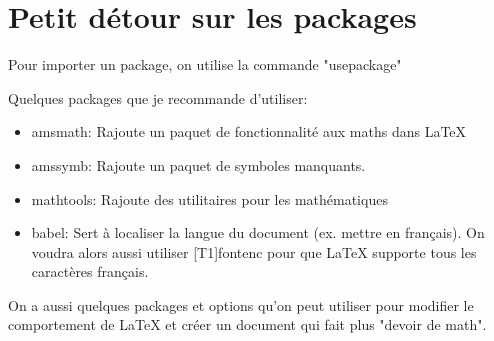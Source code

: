 \documentclass[letterpaper, french, 12pt]{article} %
\numberwithin{equation}{section}
\numberwithin{figure}{section}
\begin{document}
\section{Petit détour sur les packages}
Pour importer un package, on utilise la commande "usepackage"

Quelques packages que je recommande d'utiliser:
\begin{itemize}
    \item amsmath: Rajoute un paquet de fonctionnalité aux maths dans LaTeX
    \item amssymb: Rajoute un paquet de symboles manquants.
    \item mathtools: Rajoute des
    utilitaires pour les mathématiques
    \item babel: Sert à localiser la langue du document (ex. mettre en français). On voudra alors
    aussi utiliser [T1]fontenc
    pour que LaTeX supporte tous les caractères français.
\end{itemize}
On a aussi quelques packages et options qu'on peut utiliser pour modifier le comportement de LaTeX et créer un document qui fait plus "devoir de math".
\end{document}
